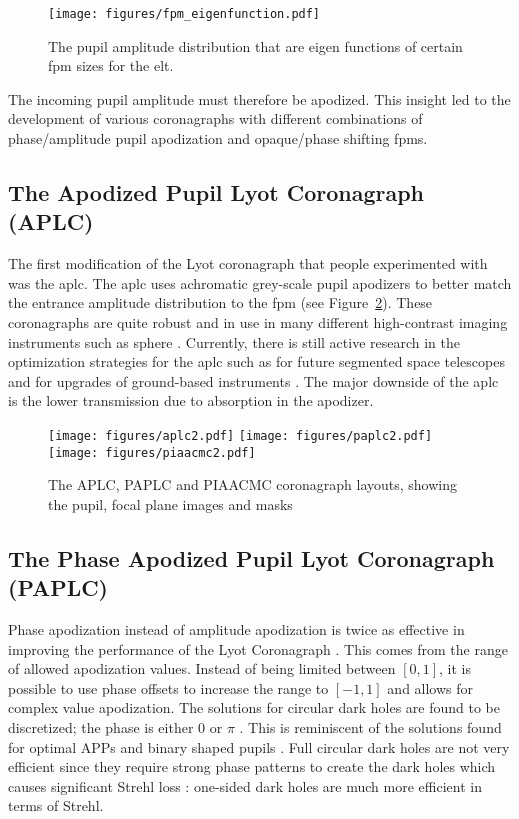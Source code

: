 \documentclass[letterpaper]{ar-1col}
\begin{document}
\begin{figure}[ht]
  \centering
  \texttt{[image: figures/fpm\_eigenfunction.pdf]}
  \caption{The pupil amplitude distribution that are eigen functions of certain \ac{fpm} sizes for the \ac{elt}.}
  \label{fig:fpm_eigenfunctions}
\end{figure}

The incoming pupil amplitude must therefore be apodized. This insight led to the development of various coronagraphs with different combinations of phase/amplitude pupil apodization and opaque/phase shifting \acp{fpm}.

\subsection{The Apodized Pupil Lyot Coronagraph (APLC)}

The first modification of the Lyot coronagraph that people experimented with was the \ac{aplc}.
%
The \ac{aplc} uses achromatic grey-scale pupil apodizers to better match the entrance amplitude distribution to the \ac{fpm} (see Figure~\ref{fig:coro_aplc}).
%
These coronagraphs are quite robust and in use in many different high-contrast imaging instruments such as \ac{sphere} \citep{beuzit2019sphere}.
%
Currently, there is still active research in the optimization strategies for the \ac{aplc} such as for future segmented space telescopes \citep{zimmerman2016lyot} and for upgrades of ground-based instruments \citep{nickson2022aplc}.
%
The major downside of the \ac{aplc} is the lower transmission due to absorption in the apodizer.

\begin{figure}[ht]
  \centering
  \texttt{[image: figures/aplc2.pdf]}
  \texttt{[image: figures/paplc2.pdf]}
  \texttt{[image: figures/piaacmc2.pdf]}
  \caption{The APLC, PAPLC and PIAACMC coronagraph layouts, showing the pupil, focal plane images and masks}
  \label{fig:coro_aplc}
\end{figure}


\subsection{The Phase Apodized Pupil Lyot Coronagraph (PAPLC)}
\label{sec:paplc}
Phase apodization instead of amplitude apodization is twice as effective in improving the performance of the Lyot Coronagraph \citep{Por20}.
%
This comes from the range of allowed apodization values.
%
Instead of being limited between $[0, 1]$, it is possible to use phase offsets to increase the range to $[-1, 1]$ and allows for complex value apodization.
%
The solutions for circular dark holes are found to be discretized; the phase is either 0 or $\pi$ \citep{Por20}.
%
This is reminiscent of the solutions found for optimal APPs \citep{Por17} and binary shaped pupils \citep{Carlotti11}.
%
Full circular dark holes are not very efficient since they require strong phase patterns to create the dark holes which causes significant Strehl loss \citep{Por17}: one-sided dark holes are much more efficient in terms of Strehl. 
\end{document}
